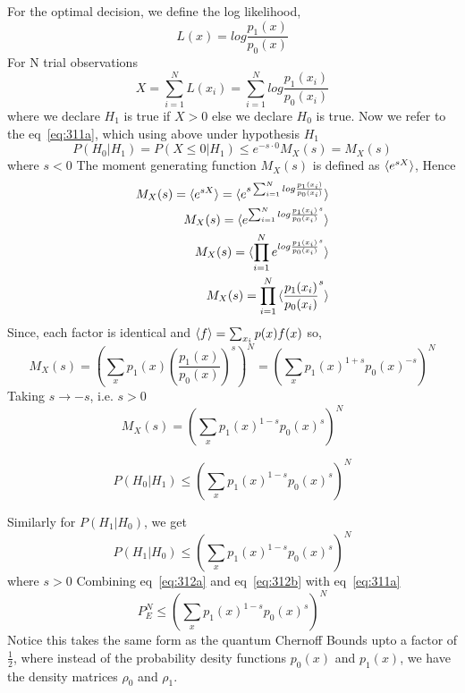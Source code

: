 For the optimal decision, we define the log likelihood,
$$L(x) = log\frac{p_1(x)}{p_0(x)}$$
For N trial observations $$X = \sum_{i=1}^N L(x_i) = \sum_{i=1}^N log\frac{p_1(x_i)}{p_0(x_i)}$$
where we declare $H_1$ is true if $X > 0$ else we declare $H_0$ is true.
Now we refer to the eq~\ref{eq:311a}, which using above under hypothesis $H_1$
$$P(H_0 | H_1) = P(X \le 0 | H_1) \le e^{-s \cdot 0} M_X(s) = M_X(s)$$
where $s < 0$
The moment generating function $M_X(s)$ is defined as $\braket{e^{sX}}$, Hence 
\begin{equation}
    \begin{split}
        M_X(s) = \braket{e^{sX}} = \braket{e^{s\sum_{i=1}^N log\frac{p_1(x_i)}{p_0(x_i)}}}\\
        M_X(s) = \braket{e^{\sum_{i=1}^N log\frac{p_1(x_i)}{p_0(x_i)}^s}}\\
        M_X(s) = \braket{\prod_{i=1}^N e^{log\frac{p_1(x_i)}{p_0(x_i)}^s}}\\
        M_X(s) = \prod_{i=1}^N \braket{\frac{p_1(x_i)}{p_0(x_i)}^s}
    \end{split}
\end{equation}
Since, each factor is identical and $\braket{f} = \sum_{x_i} p(x) f(x)$ so,
\begin{equation}
    M_X(s) = \left(\sum_{x} p_1(x) \left(\frac{p_1(x)}{p_0(x)}\right)^s\right)^N = \left(\sum_{x} p_1(x)^{1 + s} p_0(x)^{-s}\right)^N
\end{equation}
Taking $s \rightarrow -s$, i.e. $s > 0$
\begin{equation}
    M_X(s) = \left(\sum_{x} p_1(x)^{1 - s} p_0(x)^s\right)^N
\end{equation}

\begin{equation}
    P(H_0 | H_1) \le \left(\sum_{x} p_1(x)^{1 - s} p_0(x)^s\right)^N
    \label{eq:312a}
\end{equation}

Similarly for $P(H_1 | H_0)$, we get
\begin{equation}
    P(H_1 | H_0) \le \left(\sum_{x} p_1(x)^{1 - s} p_0(x)^s\right)^N
    \label{eq:312b}
\end{equation}
where $s > 0$
Combining eq~\ref{eq:312a} and eq~\ref{eq:312b} with eq~\ref{eq:311a}
\begin{equation}
    P_E^{N} \le \left(\sum_{x} p_1(x)^{1 - s} p_0(x)^s\right)^N
    \label{eq:312c}
\end{equation}
Notice this takes the same form as the quantum Chernoff Bounds upto a factor of $\frac{1}{2}$, where instead of the probability desity functions $p_0(x)$ and $p_1(x)$, we have the density matrices $\rho_0$ and $\rho_1$.



